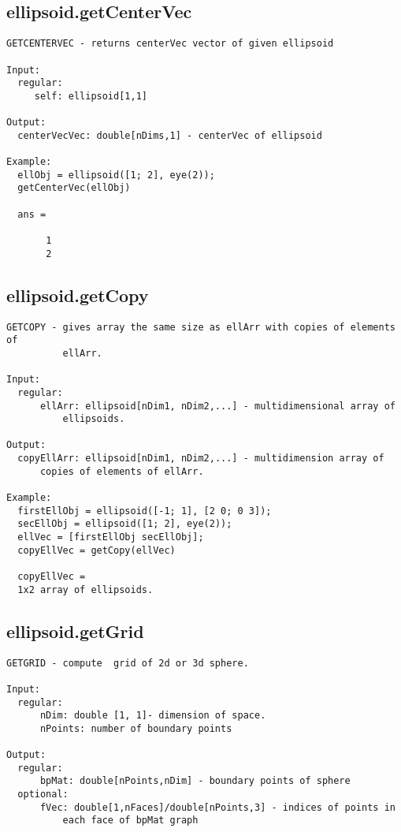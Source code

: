 \subsection{\texorpdfstring{ellipsoid.getCenterVec}{getCenterVec}}\label{method:ellipsoid.getCenterVec}
\begin{verbatim}
GETCENTERVEC - returns centerVec vector of given ellipsoid

Input:
  regular:
     self: ellipsoid[1,1]

Output:
  centerVecVec: double[nDims,1] - centerVec of ellipsoid

Example:
  ellObj = ellipsoid([1; 2], eye(2));
  getCenterVec(ellObj)

  ans =

       1
       2
\end{verbatim}
\subsection{\texorpdfstring{ellipsoid.getCopy}{getCopy}}\label{method:ellipsoid.getCopy}
\begin{verbatim}
GETCOPY - gives array the same size as ellArr with copies of elements of
          ellArr.

Input:
  regular:
      ellArr: ellipsoid[nDim1, nDim2,...] - multidimensional array of
          ellipsoids.

Output:
  copyEllArr: ellipsoid[nDim1, nDim2,...] - multidimension array of
      copies of elements of ellArr.

Example:
  firstEllObj = ellipsoid([-1; 1], [2 0; 0 3]);
  secEllObj = ellipsoid([1; 2], eye(2));
  ellVec = [firstEllObj secEllObj];
  copyEllVec = getCopy(ellVec)

  copyEllVec =
  1x2 array of ellipsoids.
\end{verbatim}
\subsection{\texorpdfstring{ellipsoid.getGrid}{getGrid}}\label{method:ellipsoid.getGrid}
\begin{verbatim}
GETGRID - compute  grid of 2d or 3d sphere.

Input:
  regular:
      nDim: double [1, 1]- dimension of space.
      nPoints: number of boundary points

Output:
  regular:
      bpMat: double[nPoints,nDim] - boundary points of sphere
  optional:
      fVec: double[1,nFaces]/double[nPoints,3] - indices of points in
          each face of bpMat graph
\end{verbatim}
